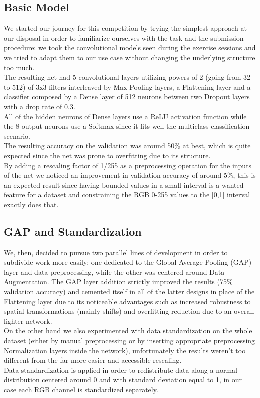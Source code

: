 \documentclass[11pt]{report}
\begin{document}
\subsection{Basic Model}
We started our journey for this competition by trying the simplest approach at our disposal in order to familiarize ourselves with the task and the submission procedure: we took the convolutional models seen during the exercise sessions and we tried to adapt them to our use case without changing the underlying structure too much. \\
The resulting net had 5 convolutional layers utilizing powers of 2 (going from 32 to 512)  of 3x3 filters interleaved by Max Pooling layers, a Flattening layer and a classifier composed by a Dense layer of 512 neurons between two Dropout layers with a drop rate of 0.3. \\
All of the hidden neurons of Dense layers use a ReLU activation function while the 8 output neurons use a Softmax since it fits well the multiclass classification scenario. \\
The resulting accuracy on the validation was around 50\% at best, which is quite expected since the net was prone to overfitting due to its structure. \\
By adding a rescaling factor of 1/255 as a preprocessing operation for the inputs of the net we noticed an improvement in validation accuracy of around 5\%, this is an expected result since having bounded values in a small interval is a wanted feature for a dataset and constraining the RGB 0-255 values to the [0,1] interval exactly does that.

\subsection{GAP and Standardization}
We, then, decided to pursue two parallel lines of development in order to subdivide work more easily: one dedicated to the Global Average Pooling (GAP) layer and data preprocessing, while the other was centered around Data Augmentation.
The GAP layer addition strictly improved the results (75\% validation accuracy) and cemented itself in all of the latter designs in place of the Flattening layer due to its noticeable advantages such as increased robustness to spatial transformations (mainly shifts) and overfitting reduction due to an overall lighter network. \\
On the other hand we also experimented with data standardization on the whole dataset (either by manual preprocessing or by inserting appropriate preprocessing Normalization layers inside the network), unfortunately the results weren’t too different from the far more easier and accessible rescaling. \\
Data standardization is applied in order to redistribute data along a normal distribution centered around 0 and with standard deviation equal to 1, in our case each RGB channel is standardized separately.
\end{document}
